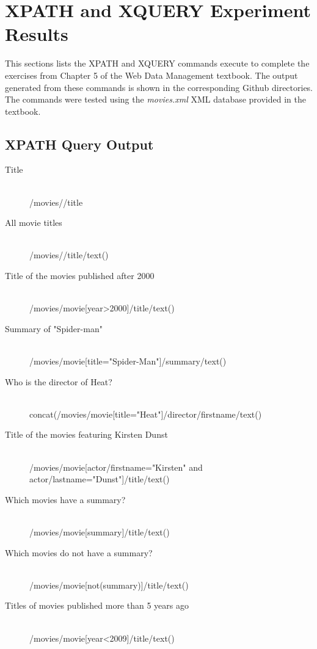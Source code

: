 \documentclass[xPath&xQuery.tex]{subfiles}
\begin{document}
\section{XPATH and XQUERY Experiment Results}
This sections lists the XPATH and XQUERY commands execute to complete the exercises from Chapter 5 of the Web Data Management textbook. The output generated from these commands is shown in the corresponding Github directories. The commands were tested using the \textit{movies.xml} XML database provided in the textbook. 

\subsection{XPATH Query Output}

\begin{description}
  \item[Title] \hfill \\
  /movies//title
  
  \item[All movie titles] \hfill \\
  /movies//title/text()
  
  \item[Title of the movies published after 2000] \hfill \\
  /movies/movie[year>2000]/title/text()
  
  \item[Summary of "Spider-man"] \hfill \\
  /movies/movie[title="Spider-Man"]/summary/text()
  
  \item[Who is the director of Heat?] \hfill \\
  concat(/movies/movie[title="Heat"]/director/firstname/text()
  
  \item[Title of the movies featuring Kirsten Dunst] \hfill \\
  /movies/movie[actor/firstname="Kirsten" and actor/lastname="Dunst"]/title/text()
  
  \item[Which movies have a summary?] \hfill \\
  /movies/movie[summary]/title/text()
  
  \item[Which movies do not have a summary?] \hfill \\
  /movies/movie[not(summary)]/title/text()
  
  \item[Titles of movies published more than 5 years ago] \hfill \\
  /movies/movie[year<2009]/title/text()
  

\end{description}
\end{document}
